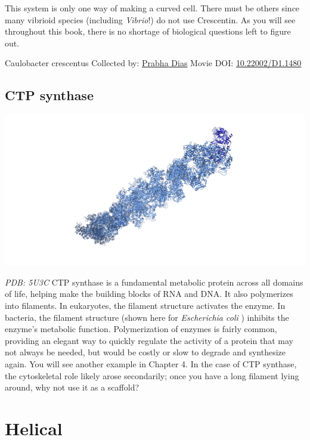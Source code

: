 \documentclass[]{tufte-book}
\begin{document}
This system is only one way of making a curved cell. There must be others since many vibrioid species (including \emph{Vibrio}!) do not use Crescentin. As you will see throughout this book, there is no shortage of biological questions left to figure out.



\hypertarget{htmlwidget-581f24a36f2324dd3d10}{}

\label{fig:3-4}Caulobacter crescentus Collected by: \protect\hyperlink{prabha_dias}{Prabha Dias} Movie DOI: \href{https://doi.org/10.22002/D1.1480}{10.22002/D1.1480}

\hypertarget{CTP_synthase}{%
\subsection{CTP synthase}\label{CTP_synthase}}

\includegraphics{img/schematics/3_4_1}

\emph{PDB: 5U3C}
CTP synthase is a fundamental metabolic protein across all domains of life, helping make the building blocks of RNA and DNA. It also polymerizes into filaments. In eukaryotes, the filament structure activates the enzyme. In bacteria, the filament structure (shown here for \emph{Escherichia coli} \citep{lynch2017}) inhibits the enzyme's metabolic function. Polymerization of enzymes is fairly common, providing an elegant way to quickly regulate the activity of a protein that may not always be needed, but would be costly or slow to degrade and synthesize again. You will see another example in Chapter 4. In the case of CTP synthase, the cytoskeletal role likely arose secondarily; once you have a long filament lying around, why not use it as a scaffold?

\hypertarget{helical}{%
\section{Helical}\label{helical}}
\end{document}

